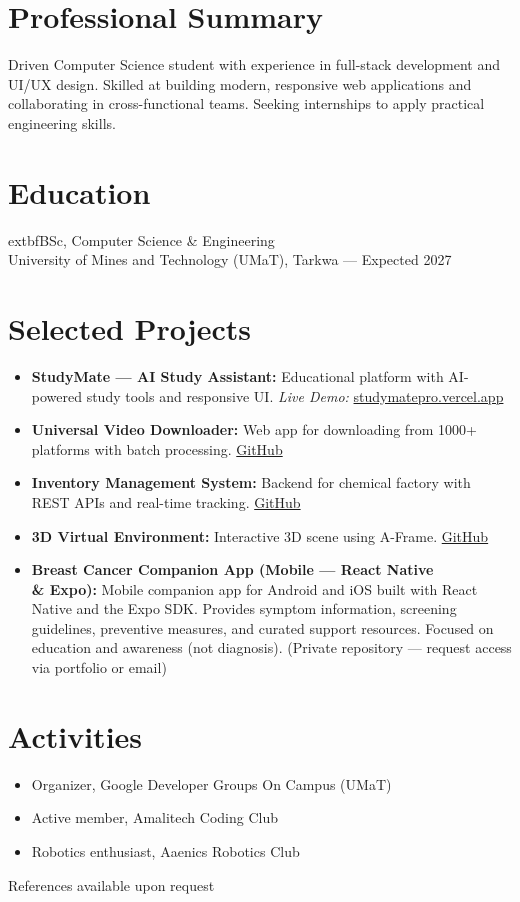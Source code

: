 \documentclass[10pt,a4paper]{article}
\begin{document}
\begin{minipage}[t]{0.66\textwidth}
  \section*{Professional Summary}
  Driven Computer Science student with experience in full-stack development and UI/UX design. Skilled at building modern, responsive web applications and collaborating in cross-functional teams. Seeking internships to apply practical engineering skills.

  \section*{Education}
  	extbf{BSc, Computer Science \& Engineering}\\
  University of Mines and Technology (UMaT), Tarkwa — Expected 2027

  \section*{Selected Projects}
  \begin{itemize}
    \item \textbf{StudyMate — AI Study Assistant:} Educational platform with AI-powered study tools and responsive UI. \textit{Live Demo:} \href{https://studymatepro.vercel.app}{studymatepro.vercel.app}
    \item \textbf{Universal Video Downloader:} Web app for downloading from 1000+ platforms with batch processing. \href{https://github.com/amaroidev/All-Sites-Downloader}{GitHub}
    \item \textbf{Inventory Management System:} Backend for chemical factory with REST APIs and real-time tracking. \href{https://github.com/amaroidev/Inventory_System_Management}{GitHub}
    \item \textbf{3D Virtual Environment:} Interactive 3D scene using A-Frame. \href{https://github.com/amaroidev/A-Frame}{GitHub}
    \item \textbf{Breast Cancer Companion App (Mobile — React Native \\& Expo):} Mobile companion app for Android and iOS built with React Native and the Expo SDK. Provides symptom information, screening guidelines, preventive measures, and curated support resources. Focused on education and awareness (not diagnosis). (Private repository — request access via portfolio or email)
  \end{itemize}

  \section*{Activities}
  \begin{itemize}
    \item Organizer, Google Developer Groups On Campus (UMaT)
    \item Active member, Amalitech Coding Club
    \item Robotics enthusiast, Aaenics Robotics Club
  \end{itemize}
\end{minipage}

\vfill
\begin{center}
  {\small\color{cvgray}References available upon request}
\end{center}
\end{document}
